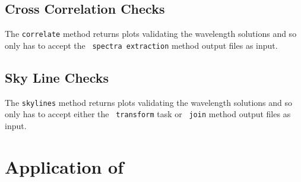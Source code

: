 

\subsection{Cross Correlation Checks} \label{subsec:test_corr}

The \texttt{correlate} method returns plots validating the wavelength solutions and so only has to accept the \polsalt\ \texttt{spectra extraction} method output files as input.


\subsection{Sky Line Checks} \label{subsec:test_sky}

The \texttt{skylines} method returns plots validating the wavelength solutions and so only has to accept either the \iraf\ \texttt{transform} task or \stops\ \texttt{join} method output files as input.


\section[Application of \textsc{stops}]{Application of \stops} \label{sec:results_unpub}


